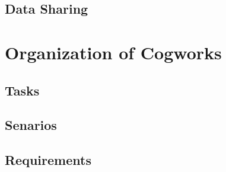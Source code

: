 \subsection{Data Sharing}

\section {Organization of Cogworks}

\subsection{Tasks}

\subsection{Senarios}


\subsection {Requirements}